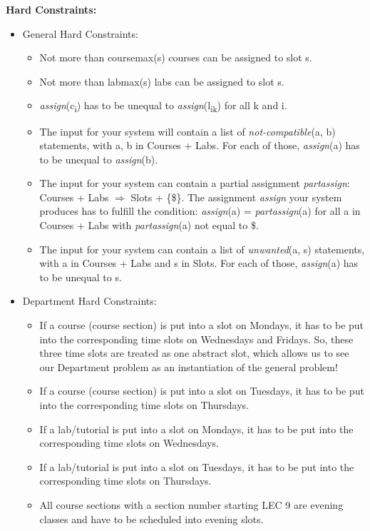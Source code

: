 \documentclass[10pt, oneside]{article}   	%
\begin{document}
\noindent \textbf{Hard Constraints:}
\begin{itemize}[topsep=0pt, itemsep=0pt]
\item General Hard Constraints:
    \begin{itemize}[topsep=0pt, itemsep=0pt]
    \item Not more than coursemax(s) courses can be assigned to slot s.
    \item Not more than labmax(s) labs can be assigned to slot s.
    \item \textit{assign}(c\textsubscript{i}) has to be unequal to \textit{assign}(l\textsubscript{ik}) for all k and i.
    \item The input for your system will contain a list of \textit{not-compatible}(a, b) statements, with a, b in Courses + Labs. For each of those, \textit{assign}(a) has to be unequal to \textit{assign}(b).
    \item The input for your system can contain a partial assignment \textit{partassign}: Courses + Labs $\Rightarrow$ Slots + \{\$\}. The assignment \textit{assign} your system produces has to fulfill the condition: 
    \textit{assign}(a) = \textit{partassign}(a) for all a in Courses + Labs with \textit{partassign}(a) not equal to \$.
    \item The input for your system can contain a list of \textit{unwanted}(a, s) statements, with a in Courses + Labs and s in Slots. For each of those, \textit{assign}(a) has to be unequal to s.
    \end{itemize}
\item Department Hard Constraints:
    \begin{itemize}[topsep=0pt, itemsep=0pt]
    \item If a course (course section) is put into a slot on Mondays, it has to be put into the corresponding time slots on Wednesdays and Fridays. So, these three time slots are treated as one abstract slot, which allows us to see our Department problem as an instantiation of the general problem!
    \item If a course (course section) is put into a slot on Tuesdays, it has to be put into the corresponding time slots on Thursdays.
    \item If a lab/tutorial is put into a slot on Mondays, it has to be put into the corresponding time slots on Wednesdays.
    \item If a lab/tutorial is put into a slot on Tuesdays, it has to be put into the corresponding time slots on Thursdays.
    \item All course sections with a section number starting LEC 9 are evening classes and have to be scheduled into evening slots.

\end{itemize}
\end{itemize}
\end{document}
